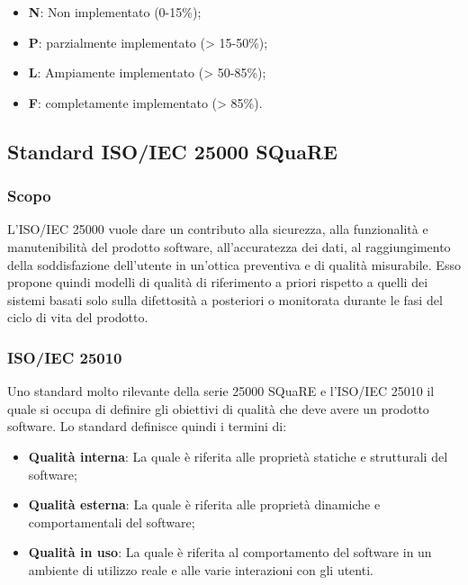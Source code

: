 \begin{itemize}
	\item \textbf{N}: Non implementato (0-15\%);
	\item \textbf{P}: parzialmente implementato (> 15-50\%);
	\item \textbf{L}: Ampiamente implementato (> 50-85\%);
	\item \textbf{F}: completamente implementato (> 85\%).
\end{itemize}
\subsection{Standard ISO/IEC 25000 SQuaRE}
\subsubsection{Scopo}
L'ISO/IEC 25000 vuole dare un contributo alla sicurezza, alla funzionalità e manutenibilità del prodotto software, all'accuratezza dei dati, al raggiungimento della soddisfazione dell'utente in un'ottica preventiva e di qualità misurabile. Esso propone quindi modelli di qualità di riferimento a priori rispetto a quelli dei sistemi basati solo sulla difettosità a posteriori o monitorata durante le fasi del ciclo di vita del prodotto.
\subsubsection{ISO/IEC 25010}
Uno standard molto rilevante della serie 25000 SQuaRE e l'ISO/IEC 25010 il quale si occupa di definire gli obiettivi di qualità che deve avere un prodotto software.
Lo standard definisce quindi i termini di:
\begin{itemize}
	\item \textbf{Qualità interna}: La quale è riferita alle proprietà statiche e strutturali del software;
	\item \textbf{Qualità esterna}: La quale è riferita alle proprietà dinamiche e comportamentali del software;
	\item \textbf{Qualità in uso}: La quale è riferita al comportamento del software in un ambiente di utilizzo reale e alle varie interazioni con gli utenti.
\end{itemize}

